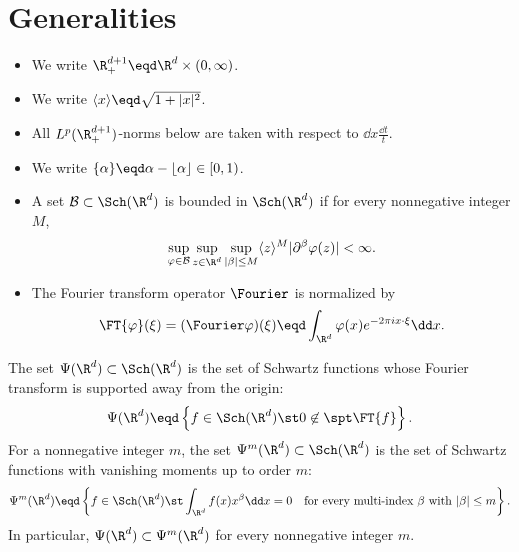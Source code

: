 \section{Generalities}\label{sec:generalities}

\begin{itemize}
\item We write \(\R^{d + 1}_+ \eqd \R^d \times (0, \infty)\).
\item We write \(\langle x \rangle \eqd \sqrt{1 + | x |^2}\).
\item All \(L^p (\R^{d + 1}_+)\)-norms below are taken with respect to \(\dd x \frac{\dd t}{t}\).
\item We write \(\{\alpha\} \eqd \alpha - \lfloor \alpha \rfloor \in [0, 1)\).
\item A set \(\mathcal{B} \subset \Sch (\R^d)\) is bounded in \(\Sch (\R^d)\) if for every nonnegative integer \(M\),
\[
\sup_{\varphi \in \mathcal{B}} \sup_{z \in \R^d}
\sup_{| \beta | \leq M}
\langle z \rangle^M | \partial^{\beta} \varphi (z) | < \infty .
\]
\item The Fourier transform operator \(\Fourier\) is normalized by
\[
\FT{\varphi} (\xi) = (\Fourier \varphi) (\xi)
\eqd \int_{\R^d} \varphi (x) e^{- 2 \pi i x \cdot \xi} \dd x .
\]
\end{itemize}

\begin{definition} \label{def:psi-classes} The set \(\Psi (\R^d) \subset \Sch (\R^d)\) is the set of Schwartz functions whose Fourier transform is supported away from the origin:
\begin{equation} \label{eq:psi-fourier-support}
\Psi (\R^d) \eqd \left\{ f \in \Sch (\R^d) \st 0 \not\in \spt \FT{f} \right\}.
\end{equation}
For a nonnegative integer \(m\), the set \(\Psi^m (\R^d) \subset \Sch (\R^d)\) is the set of Schwartz functions with vanishing moments up to order \(m\):
\begin{equation} \label{eq:psi-vanishing-moments}
\Psi^m (\R^d) \eqd \left\{ f \in \Sch (\R^d) \st
\int_{\R^d} f(x) x^{\beta}\dd x = 0
\quad \text{for every multi-index } \beta \text{ with } |\beta|\leq m\right\}.
\end{equation}
In particular, \(\Psi(\R^d) \subset \Psi^m(\R^d)\) for every nonnegative integer \(m\).
\end{definition}

